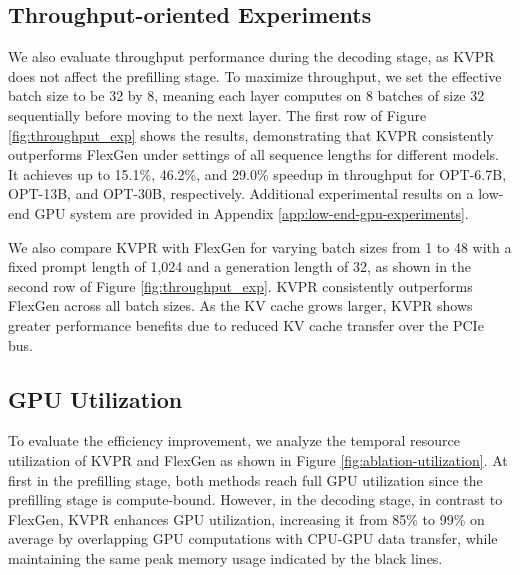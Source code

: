 \documentclass[11pt]{article}
\newcommand{\paperName}{KVPR}
\begin{document}
\subsection{Throughput-oriented Experiments}



We also evaluate throughput performance during the decoding stage, as {\paperName} does not affect the prefilling stage. To maximize throughput, we set the effective batch size to be 32 by 8, meaning each layer computes on 8 batches of size 32 sequentially before moving to the next layer. The first row of Figure \ref{fig:throughput_exp} shows the results, demonstrating that {\paperName} consistently outperforms FlexGen under settings of all sequence lengths for different models. It achieves up to 15.1\%, 46.2\%, and 29.0\% speedup in throughput for OPT-6.7B, OPT-13B, and OPT-30B, respectively. Additional experimental results on a low-end GPU system are provided in Appendix \ref{app:low-end-gpu-experiments}.

We also compare {\paperName} with FlexGen for varying batch sizes from 1 to 48 with a fixed prompt length of 1,024 and a generation length of 32, as shown in the second row of Figure \ref{fig:throughput_exp}. {\paperName} consistently outperforms FlexGen across all batch sizes. As the KV cache grows larger, {\paperName} shows greater performance benefits due to reduced KV cache transfer over the PCIe bus.



\subsection{GPU Utilization}

\noindent To evaluate the efficiency improvement, we analyze the temporal resource utilization of {\paperName} and FlexGen as shown in Figure \ref{fig:ablation-utilization}. At first in the prefilling stage, both methods reach full GPU utilization since the prefilling stage is compute-bound. However, in the decoding stage, in contrast to FlexGen, {\paperName} enhances GPU utilization, increasing it from 85\% to 99\% on average by overlapping GPU computations with CPU-GPU data transfer, while maintaining the same peak memory usage indicated by the black lines.
\end{document}
